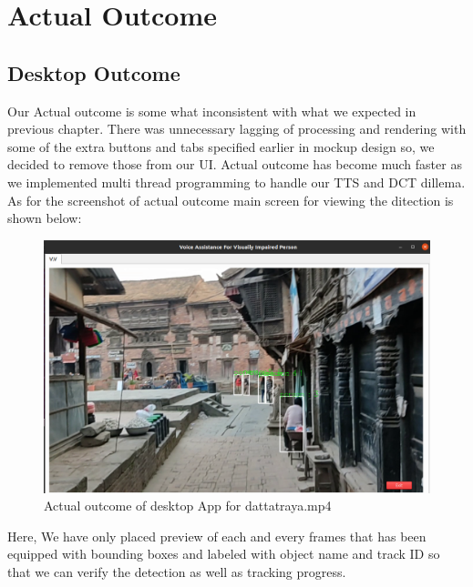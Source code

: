         \chapter{Actual Outcome}
        \section{Desktop Outcome}
       Our Actual outcome is some what inconsistent with what we expected in previous chapter. There was unnecessary lagging of processing and rendering with some of the extra buttons and tabs specified earlier in mockup design so, we decided to remove those from our UI.
       Actual outcome has become much faster as we implemented multi thread programming to handle our TTS and DCT dillema. As for the screenshot of actual outcome main screen for viewing the ditection is shown below:
        \begin{figure}[h]
                \centering
                \includegraphics[width=1\textwidth]{img/VV_actual.png}
                \caption{Actual outcome of desktop App for dattatraya.mp4}    
        \end{figure}
        \pagebreak
        \break
        Here, We have only placed preview of each and every frames that has been equipped with bounding boxes and labeled with object name and track ID so that we can verify the detection as well as tracking progress.
        \break
